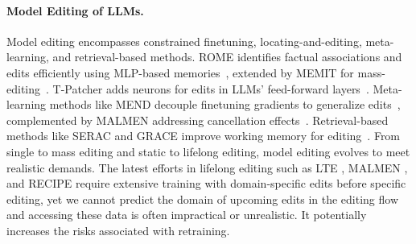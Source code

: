 \paragraph{Model Editing of LLMs.}
Model editing encompasses constrained finetuning, locating-and-editing, meta-learning, and retrieval-based methods.
ROME identifies factual associations and edits efficiently using MLP-based memories~\cite{rome}, extended by MEMIT for mass-editing~\cite{memit}. T-Patcher adds neurons for edits in LLMs' feed-forward layers~\cite{t-patcher}. Meta-learning methods like MEND decouple finetuning gradients to generalize edits~\cite{mend}, complemented by MALMEN addressing cancellation effects~\cite{malmen}. Retrieval-based methods like SERAC and GRACE improve working memory for editing~\cite{serac,grace}. From single to mass editing and static to lifelong editing, model editing evolves to meet realistic demands.
The latest efforts in lifelong editing such as LTE \cite{lte}, MALMEN \cite{malmen}, and RECIPE \cite{recipe} require extensive training with domain-specific edits before specific editing, yet we cannot predict the domain of upcoming edits in the editing flow and accessing these data is often impractical or unrealistic.
It potentially increases the risks associated with retraining.

